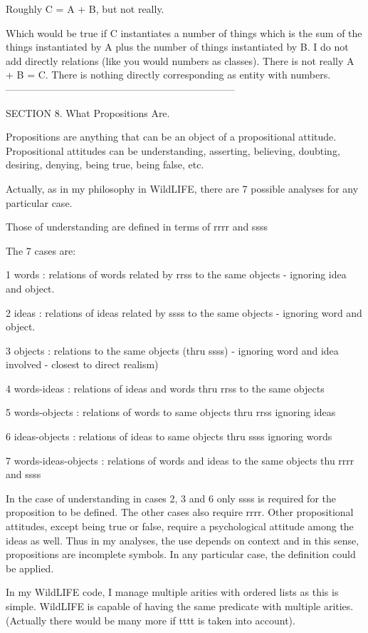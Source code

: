 \documentclass[12pt]{article}
\begin{document}
Roughly C = A + B, but not really.
 
Which would be true if C instantiates a number of things which is the sum of the things instantiated by A plus the number of things instantiated by B.
I do not add directly relations (like you would numbers as classes). There is not really A + B = C. 
There is nothing directly corresponding as entity with numbers. 
 
---------------------------------------------------------------------

SECTION 8. What Propositions Are.

Propositions are anything that can be an object of a propositional attitude. Propositional attitudes can be understanding, asserting, believing, doubting, desiring, denying, being true, being false, etc.

Actually, as in my philosophy in WildLIFE, there are 7 possible analyses for any particular case.

Those of understanding are defined in terms of rrrr and ssss

The 7 cases are:

1 words : relations of words related by rrss to the same objects - ignoring idea and object.

2 ideas : relations of ideas related by ssss to the same objects - ignoring word and object.

3 objects : relations to the same objects (thru ssss) - ignoring word and idea involved - closest to direct realism)

4 words-ideas : relations of ideas and words thru rrss to the same objects

5 words-objects : relations of words to same objects thru rrss ignoring ideas

6 ideas-objects : relations of ideas to same objects thru ssss ignoring words

7 words-ideas-objects : relations of words and ideas to the same objects thu rrrr and ssss

In the case of understanding in cases 2, 3 and 6 only ssss is required for the proposition to be defined. The other cases also require rrrr. Other propositional attitudes, except being true or false, require a psychological attitude among the ideas as well. Thus in my analyses, the use depends on context and in this sense, propositions are incomplete symbols. In any particular case, the definition could be applied.

In my WildLIFE code, I manage multiple arities with ordered lists as this is simple. WildLIFE is capable of having the same predicate with multiple arities. 
(Actually there would be many more if tttt is taken into account).
\end{document}
